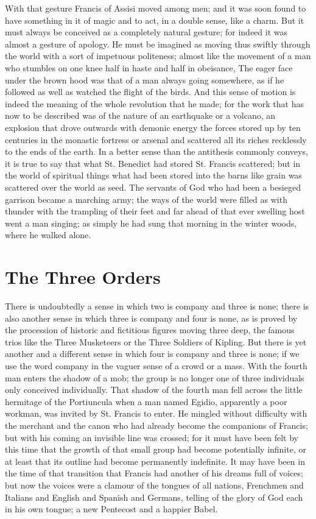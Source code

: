 \documentclass{book}
\begin{document}
With that gesture Francis of Assisi moved among men; and it was soon found to have something in it of magic and to act, in a double sense, like a charm. But it must always be conceived as a completely natural gesture; for indeed it was almost a gesture of apology. He must be imagined as moving thus swiftly through the world with a sort of impetuous politeness; almost like the movement of a man who stumbles on one knee half in haste and half in obeisance, The eager face under the brown hood was that of a man always going somewhere, as if he followed as well as watched the flight of the birds. And this sense of motion is indeed the meaning of the whole revolution that he made; for the work that has now to be described was of the nature of an earthquake or a volcano, an explosion that drove outwards with demonic energy the forces stored up by ten centuries in the monastic fortress or arsenal and scattered all its riches recklessly to the ends of the earth. In a better sense than the antithesis commonly conveys, it is true to say that what St. Benedict had stored St. Francis scattered; but in the world of spiritual things what had been stored into the barns like grain was scattered over the world as seed. The servants of God who had been a besieged garrison became a marching army; the ways of the world were filled as with thunder with the trampling of their feet and far ahead of that ever swelling host went a man singing; as simply he had sung that morning in the winter woods, where he walked alone.

\chapter{The Three Orders}
\label{chapter-6}
There is undoubtedly a sense in which two is company and three is none; there is also another sense in which three is company and four is none, as is proved by the procession of historic and fictitious figures moving three deep, the famous trios like the Three Musketeers or the Three Soldiers of Kipling. But there is yet another and a different sense in which four is company and three is none; if we use the word company in the vaguer sense of a crowd or a mass. With the fourth man enters the shadow of a mob; the group is no longer one of three individuals only conceived individually. That shadow of the fourth man fell across the little hermitage of the Portiuncula when a man named Egidio, apparently a poor workman, was invited by St. Francis to enter. He mingled without difficulty with the merchant and the canon who had already become the companions of Francis; but with his coming an invisible line was crossed; for it must have been felt by this time that the growth of that small group had become potentially infinite, or at least that its outline had become permanently indefinite. It may have been in the time of that transition that Francis had another of his dreams full of voices; but now the voices were a clamour of the tongues of all nations, Frenchmen and Italians and English and Spanish and Germans, telling of the glory of God each in his own tongue; a new Pentecost and a happier Babel.
\end{document}
